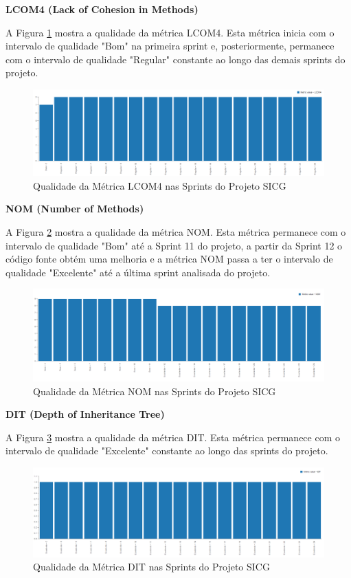 \textbf{LCOM4 (Lack of Cohesion in Methods)} 

A Figura \ref{lcom4} mostra a qualidade da métrica LCOM4. Esta métrica inicia com o intervalo de qualidade "Bom" na primeira sprint e, posteriormente, permanece com o intervalo de qualidade "Regular" constante ao longo das demais sprints do projeto.

\begin{figure}[H]
		\centering
			\includegraphics[scale=0.4]{figuras/lcom4.png}
		\caption{Qualidade da Métrica LCOM4  nas Sprints do Projeto SICG}
		\label{lcom4}
\end{figure}

\textbf{NOM (Number of Methods)} 

A Figura \ref{nom} mostra a qualidade da métrica NOM. Esta métrica permanece com o intervalo de qualidade "Bom" até a Sprint 11 do projeto, a partir da Sprint 12 o código fonte obtém uma melhoria e a métrica NOM passa a ter o intervalo de qualidade "Excelente" até a última sprint analisada do projeto.

\begin{figure}[H]
		\centering
			\includegraphics[scale=0.4]{figuras/nom.png}
		\caption{Qualidade da Métrica NOM nas Sprints do Projeto SICG}
		\label{nom}
\end{figure}

\textbf{DIT (Depth of Inheritance Tree)}

A Figura \ref{dit} mostra a qualidade da métrica DIT. Esta métrica permanece com o intervalo de qualidade "Excelente" constante ao longo das sprints do projeto.

\begin{figure}[H]
		\centering
			\includegraphics[scale=0.4]{figuras/dit.png}
		\caption{Qualidade da Métrica DIT nas Sprints do Projeto SICG}
		\label{dit}
\end{figure}

